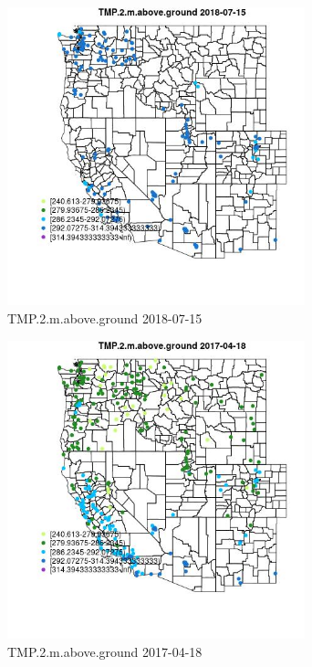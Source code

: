 \begin{figure} 
\centering  
\includegraphics[width=0.77\textwidth]{Code_Outputs/Report_ML_input_PM25_Step4_part_e_de_duplicated_aves_compiled_2019-05-20wNAs_MapObsTMP2maboveground2018-07-15.jpg} 
\caption{\label{fig:Report_ML_input_PM25_Step4_part_e_de_duplicated_aves_compiled_2019-05-20wNAsMapObsTMP2maboveground2018-07-15}TMP.2.m.above.ground 2018-07-15} 
\end{figure} 
 

\begin{figure} 
\centering  
\includegraphics[width=0.77\textwidth]{Code_Outputs/Report_ML_input_PM25_Step4_part_e_de_duplicated_aves_compiled_2019-05-20wNAs_MapObsTMP2maboveground2017-04-18.jpg} 
\caption{\label{fig:Report_ML_input_PM25_Step4_part_e_de_duplicated_aves_compiled_2019-05-20wNAsMapObsTMP2maboveground2017-04-18}TMP.2.m.above.ground 2017-04-18} 
\end{figure} 
 

